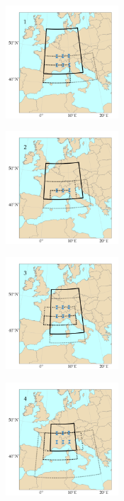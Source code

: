 \documentclass[5p]{elsarticle}
\begin{document}
\begin{figure}[htb]
	\centering
	\begin{subfigure}{.5\columnwidth}
		\centering
		\includegraphics[width=4.2cm]{figures/spatial_win_z4-hi2/Spatial_windows_1.png}
	\end{subfigure}%
	\begin{subfigure}{.5\columnwidth}
		\centering
		\includegraphics[width=4.2cm]{figures/spatial_win_z4-hi2/Spatial_windows_2.png}
	\end{subfigure}
	\begin{subfigure}{.5\columnwidth}
		\centering
		\includegraphics[width=4.2cm]{figures/spatial_win_z4-hi2/Spatial_windows_3.png}
	\end{subfigure}%
	\begin{subfigure}{.5\columnwidth}
		\centering
		\includegraphics[width=4.2cm]{figures/spatial_win_z4-hi2/Spatial_windows_4.png}

\end{subfigure}
\end{figure}
\end{document}

